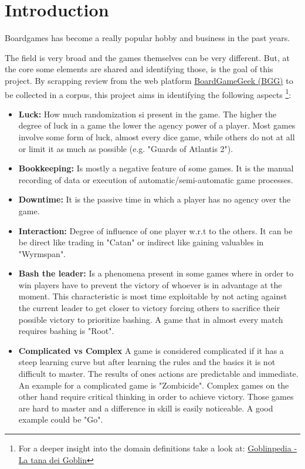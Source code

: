 \section{Introduction}

Boardgames has become a really popular hobby and business in the past years.

The field is very broad and the games themselves can be very different.
But, at the core some elements are shared and identifying those, is the goal of this project.
By scrapping review from the web platform \href{https://boardgamegeek.com/}{BoardGameGeek (BGG)}
to be collected in a corpus, this project aims in identifying the following aspects
\footnote{For a deeper insight into the domain definitions take a look at: \href{https://www.goblins.net/goblinpedia}{Goblinpedia - La tana dei Goblin}}:
\begin{itemize}
    \item{\textbf{Luck:}} How much randomization si present in the game.
    The higher the degree of luck in a game the lower the agency power of a player.
    Most games involve some form of luck, almost every dice game, while others do not at all or limit it as much as possible (e.g. "Guards of Atlantis 2").

    \item{\textbf{Bookkeeping:}} Is mostly a negative feature of some games.
    It is the manual recording of data or execution of automatic/semi-automatic game processes.

    \item{\textbf{Downtime:}} It is the passive time in which a player has no agency over the game.

    \item{\textbf{Interaction:}} Degree of influence of one player w.r.t to the others.
    It can be be direct like trading in "Catan" or indirect like gaining valuables in "Wyrmspan".

    \item{\textbf{Bash the leader:}} Is a phenomena present in some games where in order to win players
    have to prevent the victory of whoever is in advantage at the moment.
    This characteristic is most time exploitable by not acting against the current leader to get closer to
    victory forcing others to sacrifice their possible victory to prioritize bashing.
    A game that in almost every match requires bashing is "Root".

    \item{\textbf{Complicated vs Complex}} A game is considered complicated if it has a steep learning curve
    but after learning the rules and the basics it is not difficult to master.
    The results of ones actions are predictable and immediate.
    An example for a complicated game is "Zombicide".
    Complex games on the other hand require critical thinking in order to achieve victory.
    Those games are hard to master and a difference in skill is easily noticeable. A good example could be "Go".
\end{itemize}


